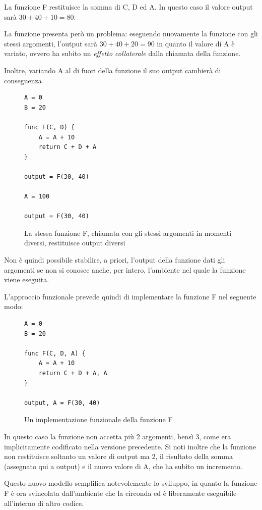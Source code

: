 \documentclass[11pt,a4paper]{report}
\newcommand{\name}[1]{{\ttfamily #1}}
\begin{document}
La funzione \name{F} restituisce la somma di \name{C}, \name{D} ed \name{A}. In questo caso il valore \name{output} sarà $30 + 40 + 10 = 80$.

La funzione presenta però un problema: eseguendo nuovamente la funzione con gli stessi argomenti, l'output sarà $30 + 40 + 20 = 90$ in quanto il valore di \name{A} è variato, ovvero ha subito un \textit{effetto collaterale} dalla chiamata della funzione.

Inoltre, variando \name{A} al di fuori della funzione il suo output cambierà di conseguenza

\begin{figure}[H]
\begin{lstlisting}
A = 0
B = 20

func F(C, D) {
	A = A + 10
	return C + D + A
}

output = F(30, 40)

A = 100

output = F(30, 40)
\end{lstlisting}
\caption{La stessa funzione \name{F}, chiamata con gli stessi argomenti in momenti diversi, restituisce output diversi}
\end{figure}

Non è quindi possibile stabilire, a priori, l'output della funzione dati gli argomenti se non si conosce anche, per intero, l'ambiente nel quale la funzione viene eseguita.

L'approccio funzionale prevede quindi di implementare la funzione \name{F} nel seguente modo:

\begin{figure}[H]
\begin{lstlisting}
A = 0
B = 20

func F(C, D, A) {
	A = A + 10
	return C + D + A, A
}

output, A = F(30, 40)
\end{lstlisting}
\label{implementazione_funzionale_F}
\caption{Un implementazione funzionale della funzione \name{F}}
\end{figure}

In questo caso la funzione non accetta più 2 argomenti, bensì 3, come era implicitamente codificato nella versione precedente. Si noti inoltre che la funzione non restituisce soltanto un valore di output ma 2, il risultato della somma (assegnato qui a \name{output}) e il nuovo valore di \name{A}, che ha subìto un incremento.

Questo nuovo modello semplifica notevolemente lo sviluppo, in quanto la funzione \name{F} è ora svincolata dall'ambiente che la circonda ed è liberamente eseguibile all'interno di altro codice.
\end{document}
